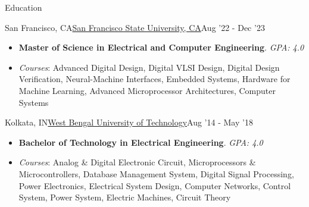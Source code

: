 \documentclass[]{mcdowellcv}
\begin{document}
	\begin{cvsection}{Education}
        \begin{cvsubsection}{San Francisco, CA}{\href{https://www.sfsu.edu/}{San Francisco State University, CA}}{Aug '22 - Dec '23}
			\begin{itemize}
                \item \textbf{Master of Science in Electrical and Computer Engineering}. \textit{GPA: 4.0}
                \item \textit{Courses}: Advanced Digital Design, Digital VLSI Design, Digital Design Verification, Neural-Machine Interfaces, Embedded Systems, Hardware for Machine Learning, Advanced Microprocessor Architectures, Computer Systems
			\end{itemize}
		\end{cvsubsection}
        \begin{cvsubsection}{Kolkata, IN}{\href{http://makautexam.net/}{West Bengal University of Technology}}{Aug '14 - May '18}
            \begin{itemize}
                \item \textbf{Bachelor of Technology in Electrical Engineering}. \textit{GPA: 4.0}
                \item \textit{Courses}: Analog \& Digital Electronic Circuit, Microprocessors \& Microcontrollers, Database Management System, Digital Signal Processing, Power Electronics, Electrical System Design, Computer Networks, Control System, Power System, Electric Machines, Circuit Theory
            \end{itemize}
        \end{cvsubsection}
	\end{cvsection}
	  
\end{document}
